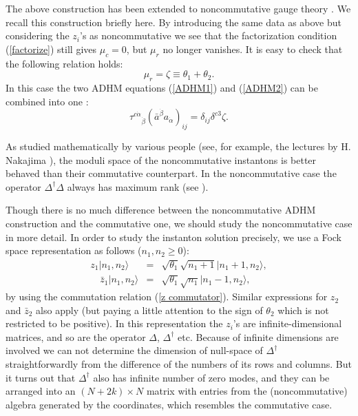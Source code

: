 \documentclass[a4paper,a4paper]{article}
\begin{document}
The above construction has been extended to noncommutative gauge theory \cite%
{Schwarz}. We recall this construction briefly here. By introducing the same
data as above but considering the $z_i$'s as noncommutative we see that the
factorization condition (\ref{factorize}) still gives $\mu_c=0$, but $\mu_r$
no longer vanishes. It is easy to check that the following relation holds:
\begin{equation}
\mu_r=\zeta\equiv\theta_1+\theta_2.
\end{equation}
In this case the two ADHM equations (\ref{ADHM1}) and (\ref{ADHM2}) can be
combined into one \cite{Paperd}:
\begin{equation}  \label{ADHM}
\tau^{c\dot\alpha}{}_{\dot\beta}(\bar a^{\dot\beta}
a_{\dot\alpha})_{ij}=\delta_{ij}\delta^{c3}\zeta.
\end{equation}

As studied mathematically by various people (see, for example, the lectures
by H. Nakajima \cite{Nakajima}), the moduli space of the noncommutative
instantons is better behaved than their commutative counterpart. In the
noncommutative case the operator $\Delta^\dagger\Delta$ always has maximum
rank (see \cite{Reviewa}).

Though there is no much difference between the noncommutative ADHM
construction and the commutative one, we should study the noncommutative
case in more detail. In order to study the instanton solution precisely, we
use a Fock space representation as follows ($n_{1},n_{2}\geq 0$):
\begin{eqnarray}
z_{1}|n_{1},n_{2}\rangle &=&\sqrt{\theta _{1}}\sqrt{n_{1}+1}%
|n_{1}+1,n_{2}\rangle , \\
\quad \bar{z}_{1}|n_{1},n_{2}\rangle &=&\sqrt{\theta _{1}}\sqrt{n_{1}}%
|n_{1}-1,n_{2}\rangle ,
\end{eqnarray}%
by using the commutation relation (\ref{z commutator}). Similar expressions
for $z_{2}$ and $\bar{z}_{2}$ also apply (but paying a little attention to
the sign of $\theta _{2}$ which is not restricted to be positive). In this
representation the $z_{i}$'s are infinite-dimensional matrices, and so are
the operator $\Delta $, $\Delta ^{\dag }$ etc. Because of infinite
dimensions are involved we can not determine the dimension of null-space of $%
\Delta ^{\dag }$ straightforwardly from the difference of the numbers of its
rows and columns. But it turns out that $\Delta ^{\dag }$ also has infinite
number of zero modes, and they can be arranged into an $(N+2k)\times N$
matrix with entries from the (noncommutative) algebra generated by the
coordinates, which resembles the commutative case.
\end{document}

